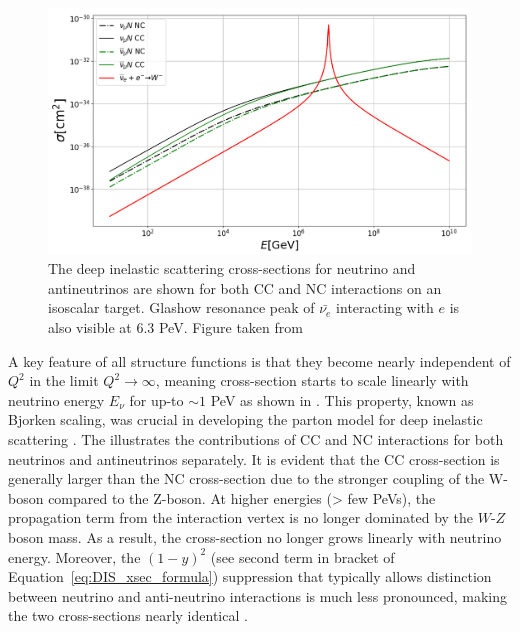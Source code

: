 \begin{figure}[h!]
        \caption{The deep inelastic scattering cross-sections for neutrino and antineutrinos are shown for both CC and NC interactions on an isoscalar target. Glashow resonance peak of $\bar{\nu_e}$ interacting with $e$ is also visible at 6.3 PeV. Figure taken from \cite{DIS_xsec_plot}}
        \includegraphics{./figures/nu_phenomenology/xsec_DIS.png}
\end{figure}
A key feature of all structure functions is that they become nearly independent of $Q^2$ in the limit $Q^2 \rightarrow \infty$, meaning cross-section starts to scale linearly with neutrino energy $E_{\nu}$ for up-to $\sim 1$ PeV as shown in . This property, known as Bjorken scaling, was crucial in developing the parton model for deep inelastic scattering .  The  illustrates the contributions of CC and NC interactions for both neutrinos and antineutrinos separately. It is evident that the CC cross-section is generally larger than the NC cross-section due to the stronger coupling of the W-boson compared to the Z-boson. At higher energies (> few PeVs), the propagation term from the interaction vertex is no longer dominated by the $W$-$Z$ boson mass. As a result, the cross-section no longer grows linearly with neutrino energy. Moreover, the $(1 - y)^2$ (see second term in bracket of Equation~\ref{eq:DIS_xsec_formula}) suppression that typically allows distinction between neutrino and anti-neutrino interactions is much less pronounced, making the two cross-sections nearly identical .

